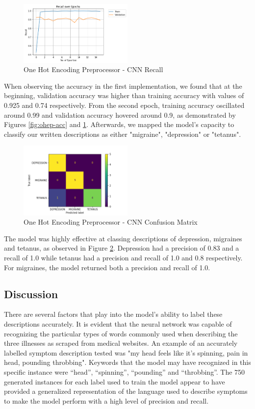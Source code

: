 \documentclass[12pt]{report}
\begin{document}
\begin{figure}[H]
	\centering
	\includegraphics[width=0.5\textwidth]{recall.png}
	\caption{One Hot Encoding Preprocessor - CNN Recall}
	\label{fig:ohep-rec}
\end{figure}

When observing the accuracy in the first implementation,
we found that at the beginning, validation accuracy was higher than training
accuracy with values of 0.925 and 0.74 respectively. From the second epoch,
training accuracy oscillated around 0.99 and validation accuracy hovered around
0.9, as demonstrated by Figures \ref{fig:ohep-acc} and \ref{fig:ohep-rec}. 
Afterwards, we mapped the
model's capacity to classify our written descriptions as either "migraine", "depression" or "tetanus".

\begin{figure}[H]
	\centering
	\includegraphics[width=0.5\textwidth]{confusion_matrix_ohe.png}
	\caption{One Hot Encoding Preprocessor - CNN Confusion Matrix}
	\label{fig:ohep-con}
\end{figure}

The model was highly effective at classing descriptions of
depression, migraines and tetanus, as observed in Figure \ref{fig:ohep-con}. 
Depression had a precision of 0.83 and a
recall of 1.0 while tetanus had a precision and recall of 1.0 and 0.8 respectively.
For migraines, the model returned both a precision and recall of 1.0.

\subsection{Discussion}
There are several factors that play into the model's ability to label these descriptions
accurately. It is evident that the neural network was capable of recognizing the particular
types of words commonly used when describing the three illnesses as scraped from medical
websites. An example of an accurately labelled symptom description tested was "my head
feels like it's spinning, pain in head, pounding throbbing". Keywords that the model
may have recognized in this specific instance were “head”, “spinning”, “pounding” and
“throbbing”. The 750 generated instances for each label used to train the model appear to
have provided a generalized representation of the language used to describe symptoms to make
the model perform with a high level of precision and recall.
\end{document}
